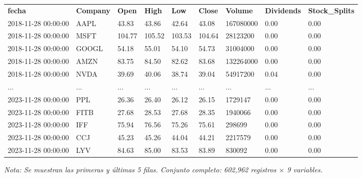 

\begin{table}[htbp]

\centering

\begin{adjustbox}{max width=\textwidth}

\begin{tabular}{lllllllll}

\rowcolor{ThemeBackground}
\rule{0pt}{0.45cm}
\textcolor{ThemeGold}{\bfseries fecha} & \textcolor{ThemeGold}{\bfseries Company} & \textcolor{ThemeGold}{\bfseries Open} & \textcolor{ThemeGold}{\bfseries High} & \textcolor{ThemeGold}{\bfseries Low} & \textcolor{ThemeGold}{\bfseries Close} & \textcolor{ThemeGold}{\bfseries Volume} & \textcolor{ThemeGold}{\bfseries Dividends} & \textcolor{ThemeGold}{\bfseries Stock\_Splits} \\

2018-11-28 00:00:00 & AAPL & 43.83 & 43.86 & 42.64 & 43.08 & 167080000 & 0.00 & 0.00 \\
2018-11-28 00:00:00 & MSFT & 104.77 & 105.52 & 103.53 & 104.64 & 28123200 & 0.00 & 0.00 \\
2018-11-28 00:00:00 & GOOGL & 54.18 & 55.01 & 54.10 & 54.73 & 31004000 & 0.00 & 0.00 \\
2018-11-28 00:00:00 & AMZN & 83.75 & 84.50 & 82.62 & 83.68 & 132264000 & 0.00 & 0.00 \\
2018-11-28 00:00:00 & NVDA & 39.69 & 40.06 & 38.74 & 39.04 & 54917200 & 0.04 & 0.00 \\
... & ... & ... & ... & ... & ... & ... & ... & ... \\
2023-11-28 00:00:00 & PPL & 26.36 & 26.40 & 26.12 & 26.15 & 1729147 & 0.00 & 0.00 \\
2023-11-28 00:00:00 & FITB & 27.68 & 28.53 & 27.68 & 28.35 & 1940066 & 0.00 & 0.00 \\
2023-11-28 00:00:00 & IFF & 75.94 & 76.56 & 75.26 & 75.61 & 298699 & 0.00 & 0.00 \\
2023-11-28 00:00:00 & CCJ & 45.23 & 45.26 & 44.04 & 44.21 & 2217579 & 0.00 & 0.00 \\
2023-11-28 00:00:00 & LYV & 84.63 & 85.00 & 83.53 & 83.89 & 830092 & 0.00 & 0.00 \\
\bottomrule
\end{tabular}

\end{adjustbox}

\vspace{0.15cm}
{\raggedright\sffamily\footnotesize\color{ThemeMuted}
\textit{Nota: Se muestran las primeras y últimas 5 filas. Conjunto completo: 602,962 registros $\times$ 9 variables.}}

\end{table}

